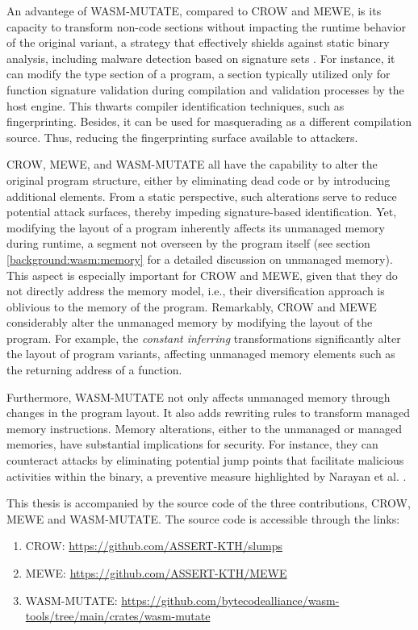 An advantege of WASM-MUTATE, compared to CROW and MEWE, is its capacity to transform non-code sections without impacting the runtime behavior of the original variant, a strategy that effectively shields against static binary analysis, including malware detection based on signature sets \cite{EVASION}.
For instance, it can modify the type section of a \Wasm program, a section typically utilized only for function signature validation during compilation and validation processes by the host engine. 
This thwarts compiler identification techniques, such as fingerprinting.
Besides, it can be used for masquerading as a different compilation source.
Thus, reducing the fingerprinting surface available to attackers.


CROW, MEWE, and WASM-MUTATE all have the capability to alter the original program structure, either by eliminating dead code or by introducing additional elements. 
From a static perspective, such alterations serve to reduce potential attack surfaces, thereby impeding signature-based identification.
Yet, modifying the layout of a \Wasm program inherently affects its unmanaged memory during runtime, a segment not overseen by the \Wasm program itself (see section \autoref{background:wasm:memory} for a detailed discussion on unmanaged memory). 
This aspect is especially important for CROW and MEWE, given that they do not directly address the \Wasm memory model, i.e., their diversification approach is oblivious to the memory of the program. 
Remarkably, CROW and MEWE considerably alter the unmanaged memory by modifying the layout of the \Wasm program.
For example, the \emph{constant inferring} transformations significantly alter the layout of program variants, affecting unmanaged memory elements such as the returning address of a function.


Furthermore, WASM-MUTATE not only affects unmanaged memory through changes in the \Wasm program layout.
It also adds rewriting rules to transform managed memory instructions. 
Memory alterations, either to the unmanaged or managed memories, have substantial implications for security. 
For instance, they can counteract attacks by eliminating potential jump points that facilitate malicious activities within the binary, a preventive measure highlighted by Narayan et al. \cite{Swivel}.


This thesis is accompanied by the source code of the three contributions, CROW, MEWE and WASM-MUTATE. 
The source code is accessible through the links:
\begin{enumerate}
    \item CROW: \url{https://github.com/ASSERT-KTH/slumps}
    \item MEWE: \url{https://github.com/ASSERT-KTH/MEWE}
    \item WASM-MUTATE: \url{https://github.com/bytecodealliance/wasm-tools/tree/main/crates/wasm-mutate}
\end{enumerate}


